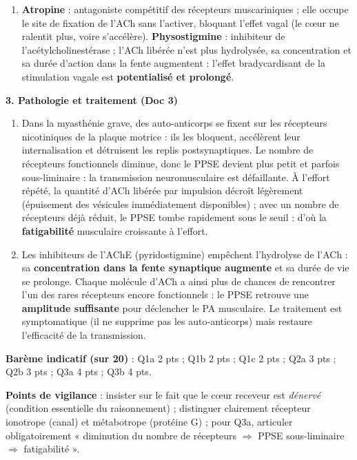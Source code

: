 \documentclass[11pt]{article}
\begin{document}
\begin{corrige}
\begin{enumerate}
    \item[b)] \textbf{Atropine} : antagoniste compétitif des récepteurs muscariniques ; elle occupe le site de fixation de l'ACh sans l'activer, bloquant l'effet vagal (le cœur ne ralentit plus, voire s'accélère). \textbf{Physostigmine} : inhibiteur de l'acétylcholinestérase ; l'ACh libérée n'est plus hydrolysée, sa concentration et sa durée d'action dans la fente augmentent : l'effet bradycardisant de la stimulation vagale est \textbf{potentialisé et prolongé}.
\end{enumerate}
\textbf{3. Pathologie et traitement (Doc 3)}
\begin{enumerate}
    \item[a)] Dans la myasthénie grave, des auto-anticorps se fixent sur les récepteurs nicotiniques de la plaque motrice : ils les bloquent, accélèrent leur internalisation et détruisent les replis postsynaptiques. Le nombre de récepteurs fonctionnels diminue, donc le PPSE devient plus petit et parfois sous-liminaire : la transmission neuromusculaire est défaillante. À l'effort répété, la quantité d'ACh libérée par impulsion décroît légèrement (épuisement des vésicules immédiatement disponibles) ; avec un nombre de récepteurs déjà réduit, le PPSE tombe rapidement sous le seuil : d'où la \textbf{fatigabilité} musculaire croissante à l'effort.
    \item[b)] Les inhibiteurs de l'AChE (pyridostigmine) empêchent l'hydrolyse de l'ACh : sa \textbf{concentration dans la fente synaptique augmente} et sa durée de vie se prolonge. Chaque molécule d'ACh a ainsi plus de chances de rencontrer l'un des rares récepteurs encore fonctionnels : le PPSE retrouve une \textbf{amplitude suffisante} pour déclencher le PA musculaire. Le traitement est symptomatique (il ne supprime pas les auto-anticorps) mais restaure l'efficacité de la transmission.
\end{enumerate}
\textbf{Barème indicatif (sur 20)} : Q1a 2 pts ; Q1b 2 pts ; Q1c 2 pts ; Q2a 3 pts ; Q2b 3 pts ; Q3a 4 pts ; Q3b 4 pts.

\textbf{Points de vigilance} : insister sur le fait que le cœur receveur est \emph{dénervé} (condition essentielle du raisonnement) ; distinguer clairement récepteur ionotrope (canal) et métabotrope (protéine G) ; pour Q3a, articuler obligatoirement « diminution du nombre de récepteurs $\Rightarrow$ PPSE sous-liminaire $\Rightarrow$ fatigabilité ».
\end{corrige}
\end{document}
